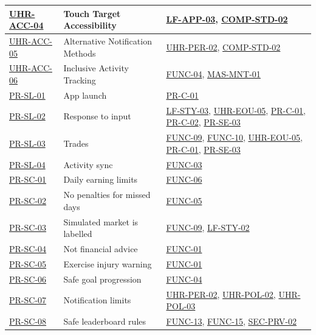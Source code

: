 \documentclass[12pt]{article}
\begin{document}
\begin{xltabular}{\textwidth}{|p{2.3cm}|p{4.2cm}|X|}
\hline
\hyperlink{req:UHR-ACC-04}{UHR-ACC-04} & Touch Target Accessibility & \hyperlink{req:LF-APP-03}{LF-APP-03}, \hyperlink{req:COMP-STD-02}{COMP-STD-02} \\
\hline
\hyperlink{req:UHR-ACC-05}{UHR-ACC-05} & Alternative Notification Methods & \hyperlink{req:UHR-PER-02}{UHR-PER-02}, \hyperlink{req:COMP-STD-02}{COMP-STD-02} \\
\hline
\hyperlink{req:UHR-ACC-06}{UHR-ACC-06} & Inclusive Activity Tracking & \hyperlink{req:FUNC-04}{FUNC-04}, \hyperlink{req:MAS-MNT-01}{MAS-MNT-01} \\
\hline
\hyperlink{req:PR-SL-01}{PR-SL-01} & App launch & \hyperlink{req:PR-C-01}{PR-C-01} \\
\hline
\hyperlink{req:PR-SL-02}{PR-SL-02} & Response to input & \hyperlink{req:LF-STY-03}{LF-STY-03}, \hyperlink{req:UHR-EOU-05}{UHR-EOU-05}, \hyperlink{req:PR-C-01}{PR-C-01}, \hyperlink{req:PR-C-02}{PR-C-02}, \hyperlink{req:PR-SE-03}{PR-SE-03} \\
\hline
\hyperlink{req:PR-SL-03}{PR-SL-03} & Trades & \hyperlink{req:FUNC-09}{FUNC-09}, \hyperlink{req:FUNC-10}{FUNC-10}, \hyperlink{req:UHR-EOU-05}{UHR-EOU-05}, \hyperlink{req:PR-C-01}{PR-C-01}, \hyperlink{req:PR-SE-03}{PR-SE-03} \\
\hline
\hyperlink{req:PR-SL-04}{PR-SL-04} & Activity sync & \hyperlink{req:FUNC-03}{FUNC-03} \\
\hline
\hyperlink{req:PR-SC-01}{PR-SC-01} & Daily earning limits & \hyperlink{req:FUNC-06}{FUNC-06} \\
\hline
\hyperlink{req:PR-SC-02}{PR-SC-02} & No penalties for missed days & \hyperlink{req:FUNC-05}{FUNC-05} \\
\hline
\hyperlink{req:PR-SC-03}{PR-SC-03} & Simulated market is labelled & \hyperlink{req:FUNC-09}{FUNC-09}, \hyperlink{req:LF-STY-02}{LF-STY-02} \\
\hline
\hyperlink{req:PR-SC-04}{PR-SC-04} & Not financial advice & \hyperlink{req:FUNC-01}{FUNC-01} \\
\hline
\hyperlink{req:PR-SC-05}{PR-SC-05} & Exercise injury warning & \hyperlink{req:FUNC-01}{FUNC-01} \\
\hline
\hyperlink{req:PR-SC-06}{PR-SC-06} & Safe goal progression & \hyperlink{req:FUNC-04}{FUNC-04} \\
\hline
\hyperlink{req:PR-SC-07}{PR-SC-07} & Notification limits & \hyperlink{req:UHR-PER-02}{UHR-PER-02}, \hyperlink{req:UHR-POL-02}{UHR-POL-02}, \hyperlink{req:UHR-POL-03}{UHR-POL-03} \\
\hline
\hyperlink{req:PR-SC-08}{PR-SC-08} & Safe leaderboard rules & \hyperlink{req:FUNC-13}{FUNC-13}, \hyperlink{req:FUNC-15}{FUNC-15}, \hyperlink{req:SEC-PRV-02}{SEC-PRV-02} \\

\end{xltabular}
\end{document}
